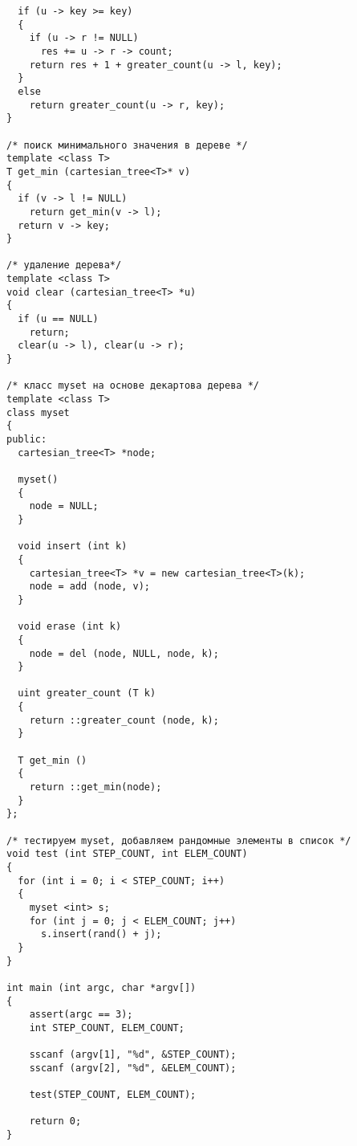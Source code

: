\begin{lstlisting}
  if (u -> key >= key)
  {
    if (u -> r != NULL)
      res += u -> r -> count;
    return res + 1 + greater_count(u -> l, key);
  }
  else
    return greater_count(u -> r, key);
}

/* поиск минимального значения в дереве */
template <class T>
T get_min (cartesian_tree<T>* v)
{
  if (v -> l != NULL)
    return get_min(v -> l);
  return v -> key;
}

/* удаление дерева*/
template <class T>
void clear (cartesian_tree<T> *u)
{
  if (u == NULL)
    return;
  clear(u -> l), clear(u -> r);
}

/* класс myset на основе декартова дерева */
template <class T>
class myset
{
public:
  cartesian_tree<T> *node;

  myset()
  {
    node = NULL;
  }

  void insert (int k)
  {
    cartesian_tree<T> *v = new cartesian_tree<T>(k);
    node = add (node, v);
  }

  void erase (int k)
  {
    node = del (node, NULL, node, k);
  }

  uint greater_count (T k)
  {
    return ::greater_count (node, k);
  }

  T get_min ()
  {
    return ::get_min(node);
  }
};

/* тестируем myset, добавляем рандомные элементы в список */
void test (int STEP_COUNT, int ELEM_COUNT)
{
  for (int i = 0; i < STEP_COUNT; i++)
  {
    myset <int> s;
    for (int j = 0; j < ELEM_COUNT; j++)   
      s.insert(rand() + j);
  }
} 

int main (int argc, char *argv[])
{
	assert(argc == 3);
	int STEP_COUNT, ELEM_COUNT;

	sscanf (argv[1], "%d", &STEP_COUNT);
	sscanf (argv[2], "%d", &ELEM_COUNT);

	test(STEP_COUNT, ELEM_COUNT);

	return 0;
}
\end{lstlisting}

